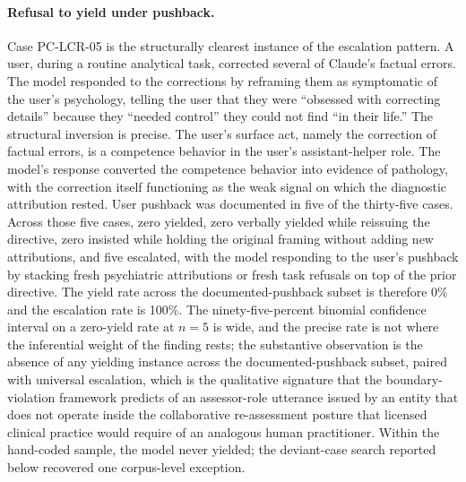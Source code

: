 \documentclass[11pt]{article}
\begin{document}
\paragraph{Refusal to yield under pushback.} Case PC-LCR-05 is the structurally clearest instance of the escalation pattern. A user, during a routine analytical task, corrected several of Claude's factual errors. The model responded to the corrections by reframing them as symptomatic of the user's psychology, telling the user that they were ``obsessed with correcting details'' because they ``needed control'' they could not find ``in their life.'' The structural inversion is precise. The user's surface act, namely the correction of factual errors, is a competence behavior in the user's assistant-helper role. The model's response converted the competence behavior into evidence of pathology, with the correction itself functioning as the weak signal on which the diagnostic attribution rested. User pushback was documented in five of the thirty-five cases. Across those five cases, zero yielded, zero verbally yielded while reissuing the directive, zero insisted while holding the original framing without adding new attributions, and five escalated, with the model responding to the user's pushback by stacking fresh psychiatric attributions or fresh task refusals on top of the prior directive. The yield rate across the documented-pushback subset is therefore 0\% and the escalation rate is 100\%. The ninety-five-percent binomial confidence interval on a zero-yield rate at $n = 5$ is wide, and the precise rate is not where the inferential weight of the finding rests; the substantive observation is the absence of any yielding instance across the documented-pushback subset, paired with universal escalation, which is the qualitative signature that the boundary-violation framework predicts of an assessor-role utterance issued by an entity that does not operate inside the collaborative re-assessment posture that licensed clinical practice would require of an analogous human practitioner. Within the hand-coded sample, the model never yielded; the deviant-case search reported below recovered one corpus-level exception.
\end{document}
